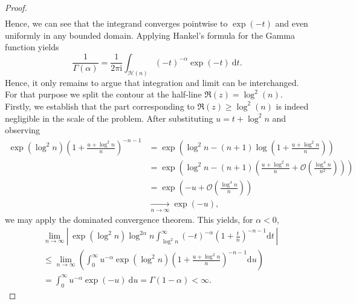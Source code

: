 \begin{proof}
\begin{equation}
\begin{split}
    \end{split}
  \end{equation}
  Hence, we can see that the integrand converges pointwise to $\exp(-t)$ and even uniformly in any bounded domain.
  Applying Hankel's formula for the Gamma function \cite[Theorem B.1, p.~745]{AnalyticCombinatorics} yields 
  $$
    \frac{1}{\Gamma(\alpha)} =
    \frac{1}{2\pi \mathrm{i}} \int_{\mathcal{H}(n)}(-t)^{-\alpha}\exp(-t)~\mathrm{d}t.
  $$
  Hence, it only remains to argue that integration and limit can be interchanged.
  For that purpose we split the contour at the half-line $\mathfrak{R}(z)  = \log^{2}(n)$. Firstly, we establish that the part corresponding to $\mathfrak{R}(z) \geq \log^{2}(n)$ is indeed negligible in the scale of the problem. 
  After substituting $u = t + \log^2 n$ and observing
  \begin{align*}
  \exp(\log^2 n) \left(1 + \frac{u + \log^2 n}{n}\right)^{-n-1} &=
  \exp\left(\log^2 n - (n+1) \log\left(1 + \frac{u + \log^2 n}{n}\right)\right) \\
  &= \exp\left(\log^2 n - (n+1) \left(\frac{u + \log^2 n}{n} + \mathcal{O}\left(\frac{\log^4 n}{n^2}\right) \right) \right) \\
  &= \exp\left(- u + \mathcal{O}\left(\frac{\log^4 n}{n}\right) \right) \\
  &\xrightarrow[n \to \infty]{} \exp(-u),
  \end{align*}
  we may apply the dominated convergence theorem. This yields, for $\alpha < 0$,
  \begin{align*}
    &\lim_{n \to \infty} \left|\, \exp(\log^2 n) \log^{2\alpha} n\int_{\log^2 n}^\infty (-t)^{-\alpha} \left(1 + \frac{t}{n}\right)^{-n-1} \mathrm{d}t\, \right| \\
    &\leq \lim_{n \to \infty} \left(\int_{0}^\infty u^{-\alpha} \exp(\log^2 n) \left(1 + \frac{u + \log^2 n}{n}\right)^{-n-1} \mathrm{d}u\right)
    \\
    &= \int_{0}^\infty u^{-\alpha} \exp(-u)~\mathrm{d}u
    = \Gamma(1 - \alpha) < \infty.
  \end{align*}

\end{proof}
